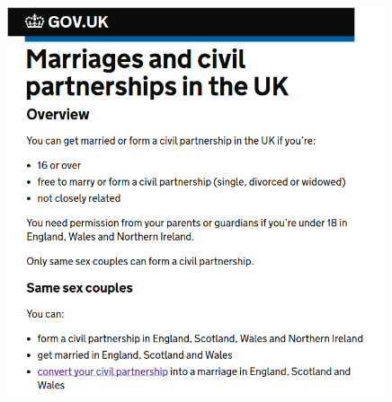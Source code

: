 \documentclass[xcolor=dvipsnames]{beamer}
\begin{document}
\begin{frame}[plain]
  \begin{columns}[T] %
    \begin{column}{0.7\textwidth}
      \begin{figure}[H]
        \centering
        \includegraphics[width=0.99\textwidth]{marriage-uk}
      \end{figure}
    \end{column}%
  \end{columns}
\end{frame}
\end{document}
